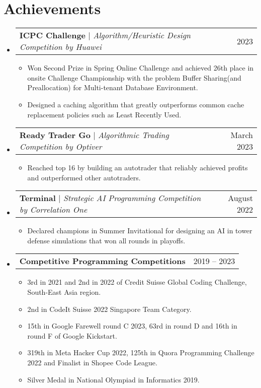 \documentclass[letterpaper,11pt]{article}
\makeatletter
\newcommand{\resumeItem}[1]{
  \item\footnotesize{
    {#1 \vspace{-2pt}}
  }
}
\newcommand{\resumeProjectHeading}[2]{
    \item
    \begin{tabular*}{0.97\textwidth}{l@{\extracolsep{\fill}}r}
      \small#1 & #2 \\
    \end{tabular*}\vspace{-6pt}
}
\newcommand{\resumeSubHeadingListStart}{\begin{itemize}[leftmargin=0.15in, label={}]}
\newcommand{\resumeSubHeadingListEnd}{\end{itemize}}
\newcommand{\resumeItemListStart}{\begin{itemize}}
\newcommand{\resumeItemListEnd}{\end{itemize}\vspace{-7pt}}
\makeatother
\begin{document}
\section{Achievements}
    \resumeSubHeadingListStart
      \resumeProjectHeading
          {\textbf{ICPC Challenge} $|$ \emph{Algorithm/Heuristic Design Competition by Huawei}}{2023}
          \resumeItemListStart
            \resumeItem{Won Second Prize in Spring Online Challenge and achieved 26th place in onsite Challenge Championship with the problem Buffer Sharing(and Preallocation) for Multi-tenant Database Environment. }
            \resumeItem{Designed a caching algorithm that greatly outperforms common cache replacement policies such as Least Recently Used. }
          \resumeItemListEnd
      \resumeProjectHeading
          {\textbf{Ready Trader Go} $|$ \emph{Algorithmic Trading Competition by Optiver}}{March 2023}
          \resumeItemListStart
            \resumeItem{Reached top 16 by building an autotrader that reliably achieved profits and outperformed other autotraders.}
          \resumeItemListEnd
      \resumeProjectHeading
          {\textbf{Terminal} $|$ \emph{Strategic AI Programming Competition by Correlation One}}{August 2022}
          \resumeItemListStart
            \resumeItem{Declared champions in Summer Invitational for designing an AI in tower defense simulations that won all rounds in playoffs.}
          \resumeItemListEnd
      \resumeProjectHeading
          {\textbf{Competitive Programming Competitions} \emph{}}{2019 -- 2023}
          \resumeItemListStart
            \resumeItem{3rd in 2021 and 2nd in 2022 of Credit Suisse Global Coding Challenge, South-East Asia region.}
            \resumeItem{2nd in CodeIt Suisse 2022 Singapore Team Category.}
            \resumeItem{15th in Google Farewell round C 2023, 63rd in round D and 16th in round F of Google Kickstart.}
            \resumeItem{319th in Meta Hacker Cup 2022, 125th in Quora Programming Challenge 2022 and Finalist in Shopee Code League.}
            \resumeItem{Silver Medal in National Olympiad in Informatics 2019.}
          \resumeItemListEnd
    \resumeSubHeadingListEnd

\end{document}

